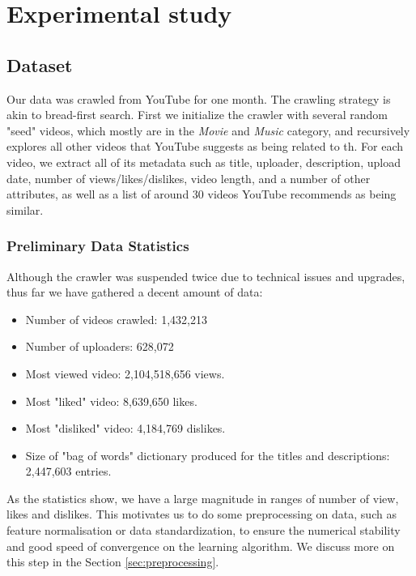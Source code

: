 \section{Experimental study}
\label{sec:experiment}

	\subsection{Dataset}
	Our data was crawled from YouTube for one month. The crawling strategy is akin to bread-first search. First we initialize the crawler with several random "seed" videos, which mostly are in the \textit{Movie} and \textit{Music} category, and recursively explores all other videos that YouTube suggests as being related to th. For each video, we extract all of its metadata such as title, uploader, description, upload date, number of views/likes/dislikes, video length, and a number of other attributes, as well as a list of around 30 videos YouTube recommends as being similar. 

		\subsubsection{Preliminary Data Statistics}

		Although the crawler was suspended twice due to technical issues and upgrades, thus far we have gathered a decent amount of data:

		\begin{itemize}
			\item Number of videos crawled: 1,432,213
			\item Number of uploaders: 628,072
			\item Most viewed video: 2,104,518,656 views.
			\item Most "liked" video: 8,639,650 likes.
			\item Most "disliked" video: 4,184,769 dislikes.
			\item Size of "bag of words" dictionary produced for the titles and descriptions: 2,447,603 entries.
		\end{itemize}

		As the statistics show, we have a large magnitude in ranges of number of view, likes and dislikes. This motivates us to do some preprocessing on data, such as feature normalisation or data standardization, to ensure the numerical stability and good speed of convergence on the learning algorithm. We discuss more on this step in the Section \ref{sec:preprocessing}.
		
